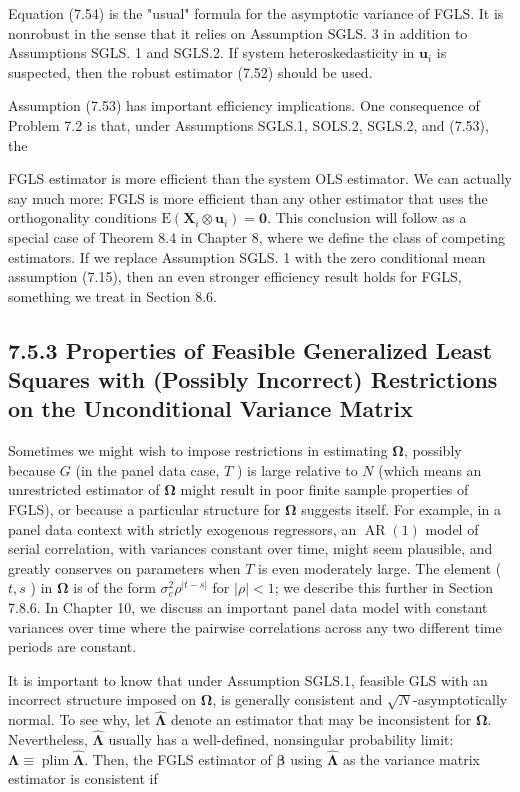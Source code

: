 \documentclass[10pt]{article}
\begin{document}
Equation (7.54) is the "usual" formula for the asymptotic variance of FGLS. It is nonrobust in the sense that it relies on Assumption SGLS. 3 in addition to Assumptions SGLS. 1 and SGLS.2. If system heteroskedasticity in $\mathbf{u}_{i}$ is suspected, then the robust estimator (7.52) should be used.

Assumption (7.53) has important efficiency implications. One consequence of Problem 7.2 is that, under Assumptions SGLS.1, SOLS.2, SGLS.2, and (7.53), the

FGLS estimator is more efficient than the system OLS estimator. We can actually say much more: FGLS is more efficient than any other estimator that uses the orthogonality conditions $\mathrm{E}\left(\mathbf{X}_{i} \otimes \mathbf{u}_{i}\right)=\mathbf{0}$. This conclusion will follow as a special case of Theorem 8.4 in Chapter 8, where we define the class of competing estimators. If we replace Assumption SGLS. 1 with the zero conditional mean assumption (7.15), then an even stronger efficiency result holds for FGLS, something we treat in Section 8.6.

\subsection*{7.5.3 Properties of Feasible Generalized Least Squares with (Possibly Incorrect) Restrictions on the Unconditional Variance Matrix}
Sometimes we might wish to impose restrictions in estimating $\boldsymbol{\Omega}$, possibly because $G$ (in the panel data case, $T$ ) is large relative to $N$ (which means an unrestricted estimator of $\boldsymbol{\Omega}$ might result in poor finite sample properties of FGLS), or because a particular structure for $\boldsymbol{\Omega}$ suggests itself. For example, in a panel data context with strictly exogenous regressors, an $\operatorname{AR}(1)$ model of serial correlation, with variances constant over time, might seem plausible, and greatly conserves on parameters when $T$ is even moderately large. The element ( $t, s$ ) in $\boldsymbol{\Omega}$ is of the form $\sigma_{e}^{2} \rho^{|t-s|}$ for $|\rho|<1$; we describe this further in Section 7.8.6. In Chapter 10, we discuss an important panel data model with constant variances over time where the pairwise correlations across any two different time periods are constant.

It is important to know that under Assumption SGLS.1, feasible GLS with an incorrect structure imposed on $\boldsymbol{\Omega}$, is generally consistent and $\sqrt{N}$-asymptotically normal. To see why, let $\hat{\boldsymbol{\Lambda}}$ denote an estimator that may be inconsistent for $\boldsymbol{\Omega}$. Nevertheless, $\hat{\boldsymbol{\Lambda}}$ usually has a well-defined, nonsingular probability limit: $\boldsymbol{\Lambda} \equiv \operatorname{plim} \hat{\boldsymbol{\Lambda}}$. Then, the FGLS estimator of $\boldsymbol{\beta}$ using $\hat{\boldsymbol{\Lambda}}$ as the variance matrix estimator is consistent if
\end{document}
